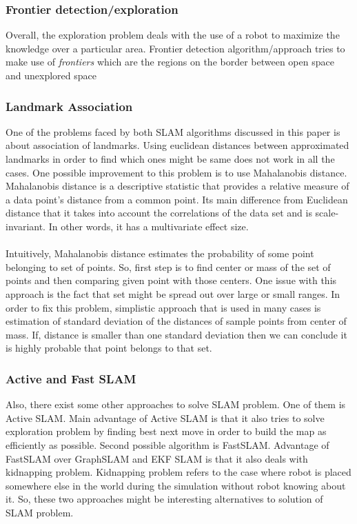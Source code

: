 \documentclass{ba-kecs}
\numberwithin{figure}{section}
\numberwithin{equation}{section}
\begin{document}
{\subsubsection{Frontier detection/exploration}
	Overall, the exploration problem deals with the use of a robot to maximize the knowledge over a particular area. Frontier detection algorithm/approach tries to make use of \textit{frontiers} which are the regions on the border between open space and unexplored space \cite{frontier}
	
\subsubsection{Landmark Association}
One of the problems faced by both SLAM algorithms discussed in this paper is about association of landmarks. Using euclidean distances between approximated landmarks in order to find which ones might be same does not work in all the cases. One possible improvement to this problem is to use Mahalanobis distance. Mahalanobis distance is a descriptive statistic that provides a relative measure of a data point's distance from a common point. Its main difference from Euclidean distance that it takes into account the correlations of the data set and is scale-invariant. In other words, it has a multivariate effect size.\\ \\
Intuitively, Mahalanobis distance estimates the probability of some point belonging to set of points. So, first step is to find center or mass of the set of points and then comparing given point with those centers. One issue with this approach is the fact that set might be spread out over large or small ranges. In order to fix this problem, simplistic approach that is used in many cases is estimation of standard deviation of the distances of sample points from center of mass. If, distance is smaller than one standard deviation then we can conclude it is highly probable that point belongs to that set.
\subsubsection{Active and Fast SLAM}
Also, there exist some other approaches to solve SLAM problem. One of them is Active SLAM. Main advantage of Active SLAM is that it also tries to solve exploration problem by finding best next move in order to build the map as efficiently as possible. Second possible algorithm is FastSLAM. Advantage of FastSLAM over GraphSLAM and EKF SLAM is that it also deals with kidnapping problem. Kidnapping problem refers to the case where robot is placed somewhere else in the world during the simulation without robot knowing about it. So, these two approaches might be interesting alternatives to solution of SLAM problem.

}
\end{document}
